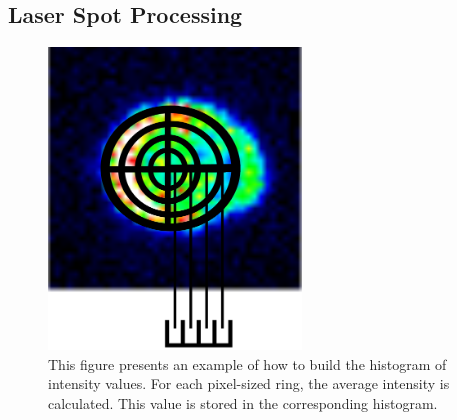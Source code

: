 \subsection{Laser Spot Processing}

\begin{figure}[t]
  \centering
  \includegraphics[width=0.6\textwidth]{images/LaserHistogramExample_crop.png}
  \caption[Diagram of histogram to calculate laser histogram]{\label{figure:LaserHistogram} This figure presents an example of how to build the histogram of intensity values. For each pixel-sized ring, the average intensity is calculated. This value is stored in the corresponding histogram.}
\end{figure}
% 

